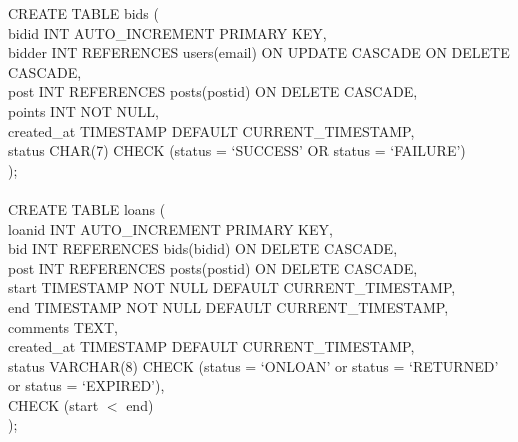 CREATE TABLE bids (\\
bidid INT AUTO\_INCREMENT PRIMARY KEY,\\
bidder INT REFERENCES users(email) ON UPDATE CASCADE ON DELETE CASCADE,\\
post INT REFERENCES posts(postid) ON DELETE CASCADE,\\
points INT NOT NULL,\\
created\_at TIMESTAMP DEFAULT CURRENT\_TIMESTAMP,\\
status CHAR(7) CHECK (status = `SUCCESS' OR status = `FAILURE')\\
);\\\\
CREATE TABLE loans (\\
loanid INT AUTO\_INCREMENT PRIMARY KEY,\\
bid INT REFERENCES bids(bidid) ON DELETE CASCADE,\\
post INT REFERENCES posts(postid) ON DELETE CASCADE,\\
start TIMESTAMP NOT NULL DEFAULT CURRENT\_TIMESTAMP,\\
end TIMESTAMP NOT NULL DEFAULT CURRENT\_TIMESTAMP,\\
comments TEXT,\\
created\_at TIMESTAMP DEFAULT CURRENT\_TIMESTAMP,\\
status VARCHAR(8) CHECK (status = `ONLOAN' or status = `RETURNED' or status = `EXPIRED'),\\
CHECK (start $<$ end)\\
);


